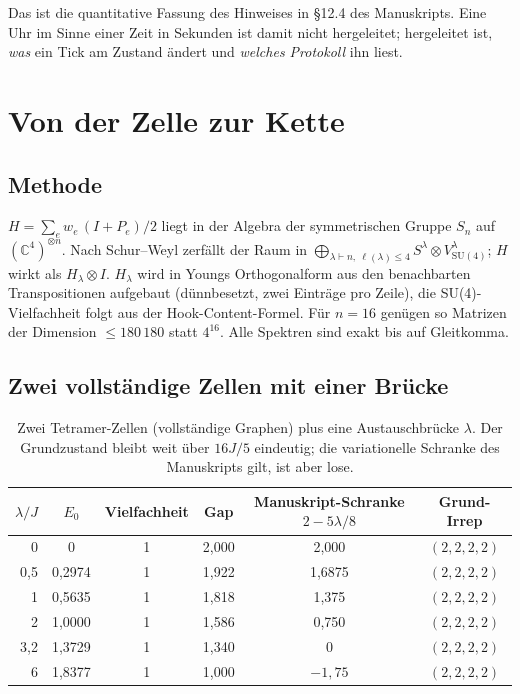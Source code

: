 Das ist die quantitative Fassung des Hinweises in §12.4 des Manuskripts. Eine Uhr im Sinne einer Zeit in Sekunden ist damit nicht hergeleitet; hergeleitet ist, \emph{was} ein Tick am Zustand ändert und \emph{welches Protokoll} ihn liest.

\section{Von der Zelle zur Kette}
\subsection{Methode}
$H=\sum_e w_e\,(I+P_e)/2$ liegt in der Algebra der symmetrischen Gruppe $S_n$ auf $(\mathbb C^4)^{\otimes n}$. Nach Schur--Weyl zerfällt der Raum in $\bigoplus_{\lambda\vdash n,\ \ell(\lambda)\le4}S^\lambda\otimes V^\lambda_{\mathrm{SU}(4)}$; $H$ wirkt als $H_\lambda\otimes I$. $H_\lambda$ wird in Youngs Orthogonalform aus den benachbarten Transpositionen aufgebaut (dünnbesetzt, zwei Einträge pro Zeile), die SU(4)-Vielfachheit folgt aus der Hook-Content-Formel. Für $n=16$ genügen so Matrizen der Dimension $\le180\,180$ statt $4^{16}$. Alle Spektren sind exakt bis auf Gleitkomma.

\subsection{Zwei vollständige Zellen mit einer Brücke}
\begin{table}[h]\centering
\begin{tabular}{@{}rccccc@{}}\toprule
$\lambda/J$ & $E_0$ & Vielfachheit & Gap & Manuskript-Schranke $2-5\lambda/8$ & Grund-Irrep\\\midrule
0 & 0 & 1 & 2{,}000 & 2{,}000 & $(2,2,2,2)$\\
0{,}5 & 0{,}2974 & 1 & 1{,}922 & 1{,}6875 & $(2,2,2,2)$\\
1 & 0{,}5635 & 1 & 1{,}818 & 1{,}375 & $(2,2,2,2)$\\
2 & 1{,}0000 & 1 & 1{,}586 & 0{,}750 & $(2,2,2,2)$\\
3{,}2 & 1{,}3729 & 1 & 1{,}340 & 0 & $(2,2,2,2)$\\
6 & 1{,}8377 & 1 & 1{,}000 & $-1{,}75$ & $(2,2,2,2)$\\\bottomrule
\end{tabular}
\caption{Zwei Tetramer-Zellen (vollständige Graphen) plus eine Austauschbrücke $\lambda$. Der Grundzustand bleibt weit über $16J/5$ eindeutig; die variationelle Schranke des Manuskripts gilt, ist aber lose.}
\end{table}

